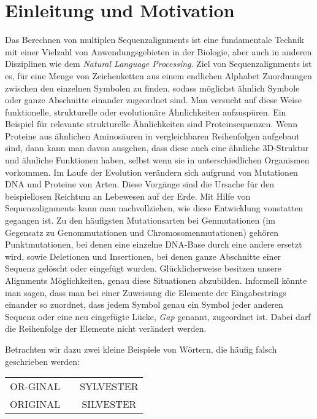 \chapter{Einleitung und Motivation}
\label{ch:einleitung}

Das Berechnen von multiplen Sequenzalignments ist eine fundamentale Technik mit einer Vielzahl von Anwendungsgebieten in der Biologie, aber auch in anderen Disziplinen wie dem \emph{Natural Language Processing}. Ziel von Sequenzalignments ist es, für eine Menge von Zeichenketten aus einem endlichen Alphabet Zuordnungen zwischen den einzelnen Symbolen zu finden, sodass möglichst ähnlich Symbole oder ganze Abschnitte einander zugeordnet sind. Man versucht auf diese Weise funktionelle, strukturelle oder evolutionäre Ähnlichkeiten aufzuspüren. Ein Beispiel für relevante strukturelle Ähnlichkeiten sind Proteinsequenzen. Wenn Proteine aus ähnlichen Aminosäuren in vergleichbaren Reihenfolgen aufgebaut sind, dann kann man davon ausgehen, dass diese auch eine ähnliche 3D-Struktur und ähnliche Funktionen haben, selbst wenn sie in unterschiedlichen Organismen vorkommen. Im Laufe der Evolution verändern sich aufgrund von Mutationen DNA und Proteine von Arten. Diese Vorgänge sind die Ursache für den beispiellosen Reichtum an Lebewesen auf der Erde. Mit Hilfe von Sequenzalignments kann man nachvollziehen, wie diese Entwicklung vonstatten gegangen ist. Zu den häufigsten Mutationsarten bei Genmutationen (im Gegensatz zu Genommutationen und Chromosomenmutationen) gehören Punktmutationen, bei denen eine einzelne DNA-Base durch eine andere ersetzt wird, sowie Deletionen und Insertionen, bei denen ganze Abschnitte einer Sequenz gelöscht oder eingefügt wurden. Glücklicherweise besitzen unsere Alignments Möglichkeiten, genau diese Situationen abzubilden. Informell könnte man sagen, dass man bei einer Zuweisung die Elemente der Eingabestrings einander so zuordnet, dass jedem Symbol genau ein Symbol jeder anderen Sequenz oder eine neu eingefügte Lücke, \emph{Gap} genannt, zugeordnet ist. Dabei darf die Reihenfolge der Elemente nicht verändert werden.

Betrachten wir dazu zwei kleine Beispiele von Wörtern, die häufig falsch geschrieben werden:

\ttfamily
\begin{center}
\begin{tabular}{|ccc|}
	\hline
		OR-GINAL & \hspace{2cm} & SYLVESTER \\
		ORIGINAL & \hspace{2cm} & SILVESTER \\
	\hline
\end{tabular}
\end{center}
\normalfont

